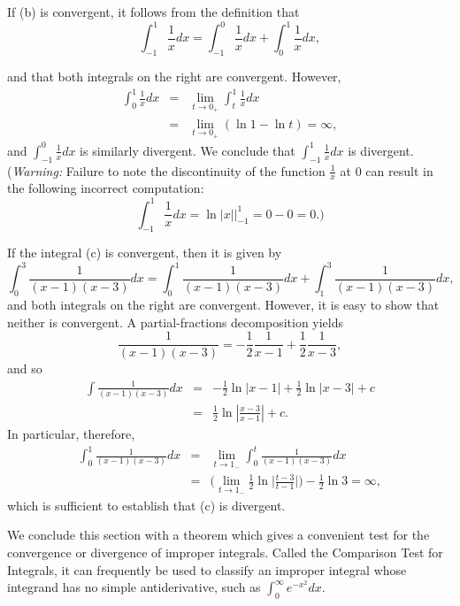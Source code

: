 \begin{example}
If (b) is convergent, it follows from the definition that 
$$
\int_{-1}^1 \frac{1}{x} dx = \int_{-1}^0 \frac{1}{x} dx + \int_{0}^1 \frac{1}{x} dx,
$$

\noindent and that both integrals on the right are convergent. However, 
\begin{eqnarray*} 
\int_0^1 \frac{1}{x} dx 
&=& \lim_{t \rightarrow 0_{+}} \int_t^1 \frac{1}{x}dx \\
&=& \lim_{t \rightarrow 0_{+}}  (\ln 1 - \ln t) = \infty ,
\end{eqnarray*}
\noindent and $\int_{-1}^0 \frac{1}{x} dx$ is similarly divergent. We conclude that $\int_{-1}^1 \frac{1}{x} dx$ is divergent.
(\textit{Warning:} Failure to note the discontinuity of the function $\frac{1}{x}$ at 0 can result in the following incorrect computation: 
$$
\int_{-1}^1 \frac{1}{x} dx = \ln |x| \Big|_{-1}^1 = 0 - 0 = 0.) 
$$

If the integral (c) is convergent, then it is given by
$$
\int_0^3 \frac{1}{(x- 1)(x - 3)} dx = 
\int_0^1 \frac{1}{(x- 1)(x - 3)} dx + 
\int_1^3 \frac{1}{(x- 1)(x - 3)} dx ,
$$
\noindent and both integrals on the right are convergent. However, it is easy to show that neither is convergent. A partial-fractions decomposition yields
$$
\frac{1}{(x- 1)(x - 3)} = -\frac{1}{2} \frac{1}{x- 1} + \frac{1}{2} \frac{1}{x- 3},
$$
\noindent and so 
 \begin{eqnarray*}
\int \frac{1}{(x- 1)(x - 3)} dx 
&=& - \frac{1}{2} \ln |x - 1| + \frac{1}{2} \ln |x - 3| + c \\
&=& \frac{1}{2} \ln |\frac{x - 3}{x - 1} | + c.
 \end{eqnarray*}
\noindent In particular, therefore, 
\begin{eqnarray*}
\int_0^1 \frac{1}{(x-1)(x-3)}dx 
&=& \lim_{t \rightarrow 1_{-}} \int_0^t \frac{1}{(x-1)(x-3)} dx \\
&=& \big( \lim_{t \rightarrow 1_{-}} \frac{1}{2} \ln \Big| \frac{t-3}{t-1} \Big| \big) - \frac{1}{2} \ln 3 = \infty, 
\end{eqnarray*}
which is sufficient to establish that (c) is divergent.
\end{example}

We conclude this section with a theorem which gives a convenient test for the convergence or divergence of improper integrals. Called the Comparison Test for Integrals, it can frequently be used to classify an improper integral whose integrand has no simple antiderivative, such as $\int_0^{\infty} e^{-x^2} dx.$

